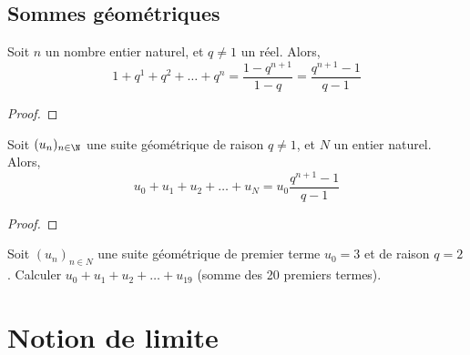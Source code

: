 \documentclass{article}
\begin{document}
\newpage
\subsection{Sommes géométriques}
\begin{tcolorbox}
\begin{proposition}
Soit $n$ un nombre entier naturel, et $q \neq 1$ un réel. Alors,
\begin{equation*}
1 + q^1 + q^2 + \dots + q^n = \dfrac{1 - q^{n+1}}{1 - q} = \dfrac{q^{n+1} - 1}{q - 1}
\end{equation*}
\end{proposition}
\end{tcolorbox}
\begin{proof}
\hfill

\vspace{0.2cm}
\emptybox{5cm}
\end{proof}
\begin{proposition}
Soit $(u_n)_{n \in \N}$ une suite géométrique de raison $q \neq 1$, et $N$ un entier naturel. Alors,
\begin{equation*}
u_0 + u_1 + u_2 + \dots + u_N = u_0 \dfrac{q^{n+1} - 1}{q - 1}
\end{equation*}
\end{proposition}
\begin{proof}
\hfill

\vspace{0.2cm}
\emptybox{5cm}
\end{proof}
\begin{example}
Soit $(u_n)_{n \in N}$ une suite géométrique de premier terme $u_0 = 3$ et de raison $q = 2$. Calculer $u_0 + u_1 + u_2 + \dots + u_{19}$ (somme des 20 premiers termes).

\vspace*{0.2cm}
\emptybox{3cm}
\end{example}
\newpage
\section{Notion de limite}
\end{document}
